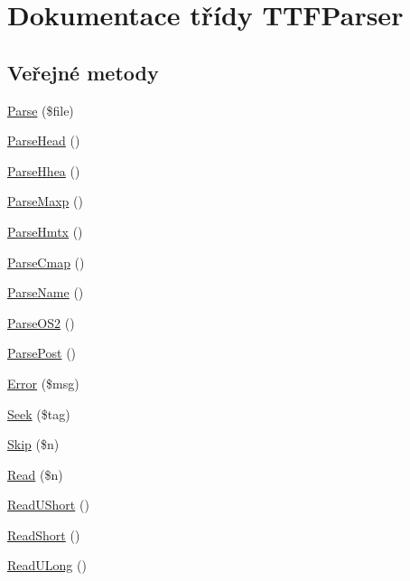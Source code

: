 \hypertarget{class_t_t_f_parser}{\section{Dokumentace třídy T\-T\-F\-Parser}
\label{class_t_t_f_parser}
}
\subsection*{Veřejné metody}
\begin{DoxyCompactItemize}
\item 
\hyperlink{class_t_t_f_parser_a00bf92696c4f3d48c5180821de2ce840}{Parse} (\$file)
\item 
\hyperlink{class_t_t_f_parser_ae87aa2ef8fef27cff059106d57d1303c}{Parse\-Head} ()
\item 
\hyperlink{class_t_t_f_parser_a5068ab1775e58f2ddf8a5c2a74e11c43}{Parse\-Hhea} ()
\item 
\hyperlink{class_t_t_f_parser_a45ca897180839588639c1c6a1fcaaf8b}{Parse\-Maxp} ()
\item 
\hyperlink{class_t_t_f_parser_adb82cd858d9cbab2cf350202662a8959}{Parse\-Hmtx} ()
\item 
\hyperlink{class_t_t_f_parser_af35ff7a233c6de7751e4df1ead414315}{Parse\-Cmap} ()
\item 
\hyperlink{class_t_t_f_parser_a1bf8839b790543a35722529d151cd0df}{Parse\-Name} ()
\item 
\hyperlink{class_t_t_f_parser_aeeb7b994865c9690f4c5e7877c89e0a6}{Parse\-O\-S2} ()
\item 
\hyperlink{class_t_t_f_parser_aecfdf351bb047a3c72cbc9db0ae75e46}{Parse\-Post} ()
\item 
\hyperlink{class_t_t_f_parser_a7a4137fee293884ff4be14dac1806b34}{Error} (\$msg)
\item 
\hyperlink{class_t_t_f_parser_aa703a58f9c3bee79dac1f61bbec475bb}{Seek} (\$tag)
\item 
\hyperlink{class_t_t_f_parser_af3fbeec4785fdd40d6295009432440cf}{Skip} (\$n)
\item 
\hyperlink{class_t_t_f_parser_a2c654758fca166436e49424c43459eac}{Read} (\$n)
\item 
\hyperlink{class_t_t_f_parser_afcf0c3429844304824d652634c3c5aef}{Read\-U\-Short} ()
\item 
\hyperlink{class_t_t_f_parser_a19ed1b90fdb6d08c73c7ef1464d88dc8}{Read\-Short} ()
\item 
\hyperlink{class_t_t_f_parser_a2401e438a38f0f3e6c9238f35ca0be98}{Read\-U\-Long} ()
\end{DoxyCompactItemize}
